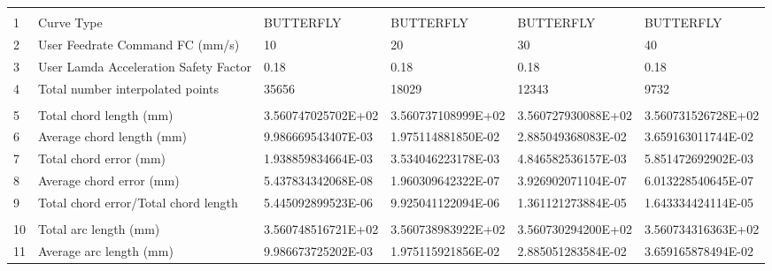 

\begin{tabular}{ p{0.5cm} p{8.0cm} p{4.00cm} p{4.0cm} p{4.00cm} p{4.0cm}}
\hline
	&                                                      &                    &                      &                    & \\
1	& Curve Type	                                       & BUTTERFLY	        & BUTTERFLY	           & BUTTERFLY          &	BUTTERFLY \\
2	& User Feedrate Command FC (mm/s)                      &	10	            &    20                &	30	            &    40 \\
3	& User Lamda Acceleration Safety Factor	               &   0.18             &	0.18               &   0.18             &   0.18 \\
4	& Total number interpolated points	                   &   35656	        &  18029	           &  12343	            &    9732 \\
	&                                                      &                    &                      &                    & \\
5	& Total chord length (mm)	                           & 3.560747025702E+02	& 3.560737108999E+02   & 3.560727930088E+02	& 3.560731526728E+02 \\
6	& Average chord length (mm)	                           & 9.986669543407E-03	& 1.975114881850E-02   & 2.885049368083E-02	& 3.659163011744E-02 \\
7	& Total chord error (mm)	                           & 1.938859834664E-03	& 3.534046223178E-03   & 4.846582536157E-03	& 5.851472692902E-03 \\
8	& Average chord error (mm)	                           & 5.437834342068E-08	& 1.960309642322E-07   & 3.926902071104E-07	& 6.013228540645E-07 \\
9	& Total chord error/Total chord length                 & 5.445092899523E-06	& 9.925041122094E-06   & 1.361121273884E-05	& 1.643334424114E-05 \\
	&                                                      &                    &                      &                    & \\
10	& Total arc length (mm)	                               & 3.560748516721E+02	& 3.560738983922E+02   & 3.560730294200E+02	& 3.560734316363E+02 \\
11	& Average arc length (mm)	                           & 9.986673725202E-03	& 1.975115921856E-02   & 2.885051283584E-02	& 3.659165878494E-02 \\

\end{tabular}
